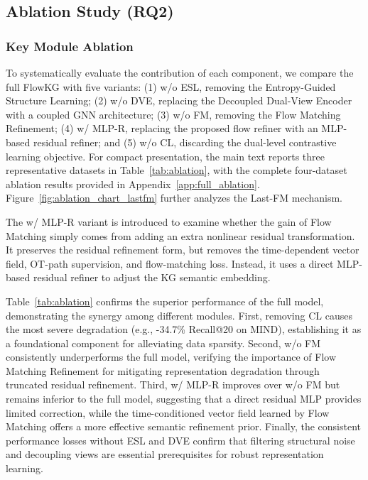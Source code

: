 \subsection{Ablation Study (RQ2)}
\subsubsection{\textbf{Key Module Ablation}}

To systematically evaluate the contribution of each component, we compare the full FlowKG with five variants: (1) w/o ESL, removing the Entropy-Guided Structure Learning; (2) w/o DVE, replacing the Decoupled Dual-View Encoder with a coupled GNN architecture; (3) w/o FM, removing the Flow Matching Refinement; (4) w/ MLP-R, replacing the proposed flow refiner with an MLP-based residual refiner; and (5) w/o CL, discarding the dual-level contrastive learning objective. For compact presentation, the main text reports three representative datasets in Table~\ref{tab:ablation}, with the complete four-dataset ablation results provided in Appendix~\ref{app:full_ablation}. Figure~\ref{fig:ablation_chart_lastfm} further analyzes the Last-FM mechanism.

The w/ MLP-R variant is introduced to examine whether the gain of Flow Matching simply comes from adding an extra nonlinear residual transformation. It preserves the residual refinement form, but removes the time-dependent vector field, OT-path supervision, and flow-matching loss. Instead, it uses a direct MLP-based residual refiner to adjust the KG semantic embedding.

Table~\ref{tab:ablation} confirms the superior performance of the full model, demonstrating the synergy among different modules. First, removing CL causes the most severe degradation (e.g., -34.7\% Recall@20 on MIND), establishing it as a foundational component for alleviating data sparsity. Second, w/o FM consistently underperforms the full model, verifying the importance of Flow Matching Refinement for mitigating representation degradation through truncated residual refinement. Third, w/ MLP-R improves over w/o FM but remains inferior to the full model, suggesting that a direct residual MLP provides limited correction, while the time-conditioned vector field learned by Flow Matching offers a more effective semantic refinement prior. Finally, the consistent performance losses without ESL and DVE confirm that filtering structural noise and decoupling views are essential prerequisites for robust representation learning.


